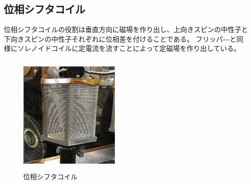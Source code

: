 \subsection{位相シフタコイル}
位相シフタコイルの役割は垂直方向に磁場を作り出し、上向きスピンの中性子と下向きスピンの中性子それぞれに位相差を付けることである。
フリッパ―と同様にソレノイドコイルに定電流を流すことによって定磁場を作り出している。
\begin{figure}[H]
\centering
\includegraphics[width=5cm,height=6cm]{device/shifterphoto.pdf}\caption{位相シフタコイル}
\end{figure}
\endgroup
